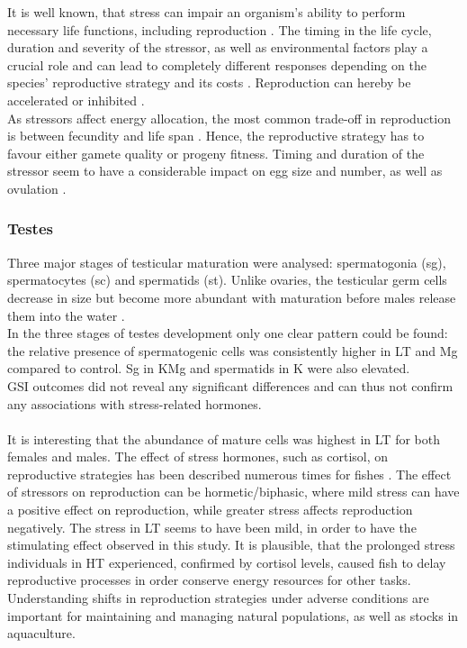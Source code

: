\documentclass[twoside]{article}
\begin{document}
\begin{multicols}{2}
It is well known, that stress can impair an organism's ability to perform necessary life functions, including reproduction \citep{Schreck2001}. %
The timing in the life cycle, duration and severity of the stressor, as well as environmental factors play a crucial role and can lead to completely different responses depending on the species' reproductive strategy and its costs \citep{Schreck2001}. Reproduction can hereby be accelerated or inhibited \citep{schreck2010}. \\ 
As stressors affect energy allocation,  the most common trade-off in reproduction is between fecundity and life span \citep{Schreck2001}. Hence, the reproductive strategy has to favour either gamete quality or progeny fitness. Timing and duration of the stressor seem to have a considerable impact on egg size and number, as well as ovulation \citep{contreras1998,campbell1992,morehead2000}. 

\subsubsection*{Testes}
Three major stages of testicular maturation were analysed: spermatogonia (sg), spermatocytes (sc) and spermatids (st). Unlike ovaries, the testicular germ cells decrease in size but become more abundant with maturation before males release them into the water \citep{Leino}. \\
In the three stages of testes development only one clear pattern could be found: the relative presence of spermatogenic cells was consistently higher in LT and Mg compared to control. Sg in KMg and spermatids in K were also elevated. \\
GSI outcomes did not reveal any significant differences and can thus not confirm any associations with stress-related hormones. \\ \\ 
It is interesting that the abundance of mature cells was highest in LT for both females and males. The effect of stress hormones, such as cortisol, on reproductive strategies has been described numerous times for fishes \citep{pickering1981,bonga1997,Schreck2001}. The effect of stressors on reproduction can be hormetic/biphasic, where mild stress can have a positive effect on reproduction, while greater stress affects reproduction negatively.  The stress in LT seems to have been mild, in order to have the stimulating effect observed in this study. It is plausible, that the prolonged stress individuals in HT experienced, confirmed by cortisol levels, caused fish to delay reproductive processes in order conserve energy resources for other tasks. \\
Understanding shifts in reproduction strategies under adverse conditions are important for maintaining and managing natural populations, as well as stocks in aquaculture. 


\end{multicols}
\end{document}

